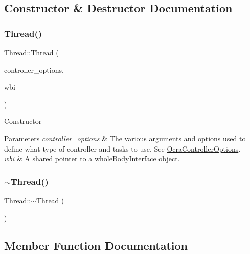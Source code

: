 \subsection{Constructor \& Destructor Documentation}
\hypertarget{classThread_a7494a3cf676527432ee724d59ed9ee8f}{}\label{classThread_a7494a3cf676527432ee724d59ed9ee8f} 
\subsubsection{\texorpdfstring{Thread()}{Thread()}}
{\footnotesize\ttfamily Thread\+::\+Thread (\begin{DoxyParamCaption}\item[{\hyperlink{classOcraControllerOptions}{Ocra\+Controller\+Options} \&}]{controller\+\_\+options,  }\item[{std\+::shared\+\_\+ptr$<$ wbi\+::whole\+Body\+Interface $>$}]{wbi }\end{DoxyParamCaption})}

Constructor 
\begin{DoxyParams}{Parameters}
{\em controller\+\_\+options} & The various arguments and options used to define what type of controller and tasks to use. See \hyperlink{classOcraControllerOptions}{Ocra\+Controller\+Options}. \\
\hline
{\em wbi} & A shared pointer to a whole\+Body\+Interface object. \\
\hline
\end{DoxyParams}
\hypertarget{classThread_a37d9edd3a1a776cbc27dedff949c9726}{}\label{classThread_a37d9edd3a1a776cbc27dedff949c9726} 
\subsubsection{\texorpdfstring{$\sim$\+Thread()}{~Thread()}}
{\footnotesize\ttfamily Thread\+::$\sim$\+Thread (\begin{DoxyParamCaption}{ }\end{DoxyParamCaption})\hspace{0.3cm}{\ttfamily [virtual]}}



\subsection{Member Function Documentation}
\hypertarget{classThread_a2c64d83df66f7168d34993b76a179dde}{}\label{classThread_a2c64d83df66f7168d34993b76a179dde} 
